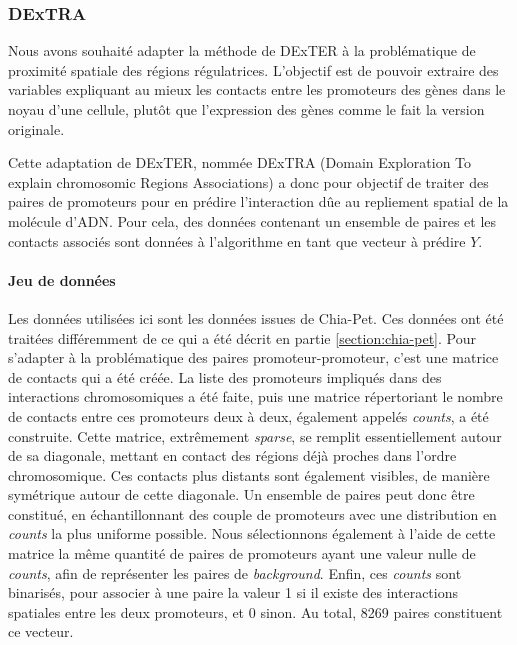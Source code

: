 \documentclass[french]{llncs}
\begin{document}
\subsubsection{DExTRA} \label{section:dextra}



Nous avons souhaité adapter la méthode de DExTER à la problématique de proximité spatiale des régions régulatrices. L'objectif est de pouvoir extraire des variables expliquant au mieux les contacts entre les promoteurs des gènes dans le noyau d'une cellule, plutôt que l'expression des gènes comme le fait la version originale.


Cette adaptation de DExTER, nommée DExTRA (Domain Exploration To explain chromosomic Regions Associations) a donc pour objectif de traiter des paires de promoteurs pour en prédire l'interaction dûe au repliement spatial de la molécule d'ADN. Pour cela, des données contenant un ensemble de paires et les contacts associés sont données à l'algorithme en tant que vecteur à prédire $Y$.

\paragraph{Jeu de données}

Les données utilisées ici sont les données issues de Chia-Pet. Ces données ont été traitées différemment de ce qui a été décrit en partie \ref{section:chia-pet}. Pour s'adapter à la problématique des paires promoteur-promoteur, c'est une matrice de contacts qui a été créée. La liste des promoteurs impliqués dans des interactions chromosomiques a été faite, puis une matrice répertoriant le nombre de contacts entre ces promoteurs deux à deux, également appelés \textit{counts}, a été construite. Cette matrice, extrêmement \textit{sparse}, se remplit essentiellement autour de sa diagonale, mettant en contact des régions déjà proches dans l'ordre chromosomique. Ces contacts plus distants sont également visibles, de manière symétrique autour de cette diagonale. Un ensemble de paires peut donc être constitué, en échantillonnant des couple de promoteurs avec une distribution en \textit{counts} la plus uniforme possible. Nous sélectionnons également à l'aide de cette matrice la même quantité de paires de promoteurs ayant une valeur nulle de \textit{counts}, afin de représenter les paires de \textit{background}. Enfin, ces \textit{counts} sont binarisés, pour associer à une paire la valeur 1 si il existe des interactions spatiales entre les deux promoteurs, et 0 sinon. Au total, 8269 paires constituent ce vecteur. 
\end{document}
